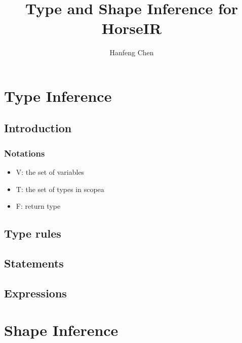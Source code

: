 \documentclass{report}
\author{Hanfeng Chen}
\title{Type and Shape Inference for HorseIR}
\begin{document}
\maketitle


\newpage

\tableofcontents %

\newpage

\setcounter{page}{1}

\chapter{Type Inference}

\section{Introduction}

\subsection{Notations}

\begin{itemize}
\item V: the set of variables
\item T: the set of types in scopea
\item F: return type
\end{itemize}

\section{Type rules} \label{Sec::type_rules}


\section{Statements} \label{Sec::stmts}


\section{Expressions} \label{Sec::exprs}


\chapter{Shape Inference}

\end{document}
